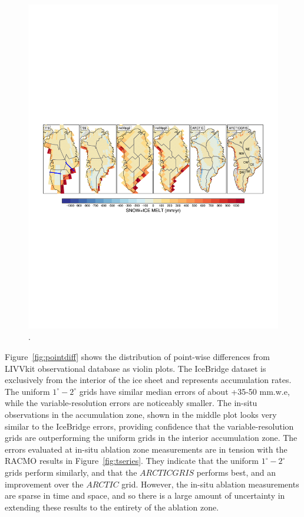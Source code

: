\documentclass[draft]{agujournal2019}
\begin{document}
\begin{figure}[t]
\begin{center}
         \includegraphics[width=130mm]{figs/temp_contours_diffRACMO_melt.pdf}
\end{center}
\caption{.}
\label{fig:melt}
\end{figure}

Figure~\ref{fig:pointdiff} shows the distribution of point-wise differences from LIVVkit observational database as violin plots. The IceBridge dataset is exclusively from the interior of the ice sheet and represents accumulation rates. The uniform $1^{\circ}-2^{\circ}$ grids have similar median errors of about +35-50 mm.w.e, while the variable-resolution errors are noticeably smaller. The in-situ observations in the accumulation zone, shown in the middle plot looks very similar to the IceBridge errors, providing confidence that the variable-resolution grids are outperforming the uniform grids in the interior accumulation zone. The errors evaluated at in-situ ablation zone measurements are in tension with the RACMO results in Figure~\ref{fig:tseries}. They indicate that the uniform $1^{\circ}-2^{\circ}$ grids perform similarly, and that the $ARCTICGRIS$ performs best, and an improvement over the $ARCTIC$ grid. However, the in-situ ablation measurements are sparse in time and space, and so there is a large amount of uncertainty in extending these results to the entirety of the ablation zone.
\end{document}
